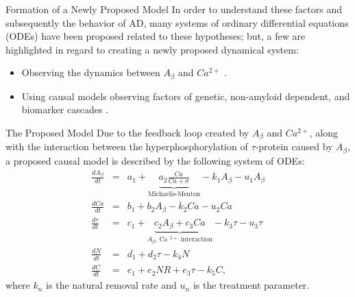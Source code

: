 \documentclass[9pt, dvipsnames,compress,aspectratio=169]{beamer}
\begin{document}
\begin{frame}{Formation of a Newly Proposed Model}
    In order to understand these factors and subsequently the behavior of AD, many systems of ordinary differential equations (ODEs) have been proposed related to these hypotheses; but, a few are highlighted in regard to creating a newly proposed dynamical system:
    \begin{itemize}
        \item Observing the dynamics between $A_\beta$ and $Ca ^{2+}$ \cite{pal2025nonequilibrium}.
        \item Using causal models observing factors of genetic, non-amyloid dependent, and biomarker cascades \cite{petrella2019computational}.
    \end{itemize}
\end{frame}

\begin{frame}{The Proposed Model}
    Due to the feedback loop created by $A_\beta$ and $Ca ^{2+}$, along with the interaction between the hyperphosphorylation of $\tau$-protein caused by $A_\beta$, a proposed causal model is described by the following system of ODEs:
    \begin{eqnarray}
        \frac{dA _{\beta}}{dt}&=&a _{1}+\underbrace{a _{2}\frac{Ca}{Ca+\sigma}}_{\text{Michaelis-Menton}}- k_1 A _{\beta} - u_1 A_\beta\\
        \frac{dCa}{dt}&=& b _{1}+b _{2}A _{\beta}- k_2 Ca - u_2 Ca\\
        \frac{d \tau}{dt}&=&c _{1}+\underbrace{c _{2}A _{\beta}+c _{3}Ca}_{\text{$A_\beta$, Ca $^{2+}$ interaction}}- k_3 \tau - u_3 \tau\\
        \frac{dN}{dt}&=&d _{1}+d _{2}\tau-k _{4}N\\
        \frac{dC}{dt}&=&e _{1}+e _{2}NR + e _{3}\tau - k_5 C,
    \end{eqnarray}
    where $k_n$ is the natural removal rate and $u_n$ is the treatment parameter.
\end{frame}
\end{document}
